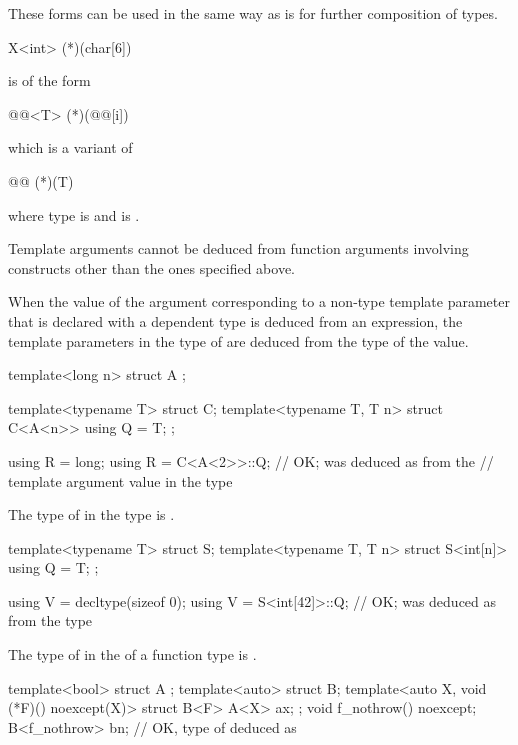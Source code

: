 \pnum
These forms can be used in the same way as
is for further composition of types.
\begin{example}
\begin{codeblock}
X<int> (*)(char[6])
\end{codeblock}
is of the form
\begin{codeblock}
@@<T> (*)(@@[i])
\end{codeblock}
which is a variant of
\begin{codeblock}
@@ (*)(T)
\end{codeblock}
where type is
and
is
.
\end{example}

\pnum
Template arguments cannot be deduced from function arguments involving
constructs other than the ones specified above.

\pnum
When the value of the argument
corresponding to a non-type template parameter 
that is declared with a dependent type
is deduced from an expression,
the template parameters in the type of 
are deduced from the type of the value.
\begin{example}
\begin{codeblock}
template<long n> struct A { };

template<typename T> struct C;
template<typename T, T n> struct C<A<n>> {
  using Q = T;
};

using R = long;
using R = C<A<2>>::Q;           // OK;  was deduced as  from the
                                // template argument value in the type 
\end{codeblock}
\end{example}

\pnum
The type of  in the type  is .
\begin{example}
\begin{codeblock}
template<typename T> struct S;
template<typename T, T n> struct S<int[n]> {
  using Q = T;
};

using V = decltype(sizeof 0);
using V = S<int[42]>::Q;        // OK;  was deduced as  from the type 
\end{codeblock}
\end{example}

\pnum
The type of  in the 
 of a function type is .
\begin{example}
\begin{codeblock}
template<bool> struct A { };
template<auto> struct B;
template<auto X, void (*F)() noexcept(X)> struct B<F> {
  A<X> ax;
};
void f_nothrow() noexcept;
B<f_nothrow> bn;                // OK, type of  deduced as 
\end{codeblock}
\end{example}

